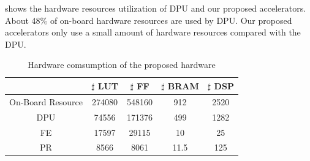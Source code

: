  shows the hardware resources utilization of DPU and our proposed accelerators. About 48\% of on-board hardware resources are used by DPU. Our proposed accelerators only use a small amount of hardware resources compared with the DPU.
\begin{table}[t]
  \centering
  \caption{Hardware comsumption of the proposed hardware}
\begin{tabular}{|c|c|c|c|c|}
  \hline
        & $\sharp$ LUT & $\sharp$ FF & $\sharp$ BRAM & $\sharp$ DSP \bigstrut\\
  \hline
  On-Board Resource &  274080      &  548160     & 912 &   2520   \bigstrut\\
  \hline
  DPU &  74556      &   171376    & 499 &   1282   \bigstrut\\
  \hline
  FE &  17597     &   29115    & 10 & 25      \bigstrut\\
  \hline
  PR &  8566     &   8061    & 11.5 & 125      \bigstrut\\
  \hline
  \end{tabular}%
  
  
  
  
  \label{tab:hardware}%
\end{table}%